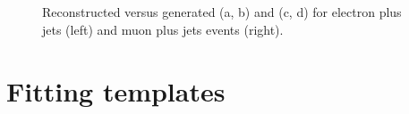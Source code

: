  \begin{figure}[hbtp]
	\centering
	\hfill
	\\
	\hfill
	\\
	\caption{Reconstructed versus generated \WPT (a, b) and \MT (c, d) for electron plus jets (left) and muon plus jets
	events (right).}
	\label{fig:choice_of_bins_appendix_2}
 \end{figure}

\newpage



\chapter{Fitting templates}
\label{a:templates}




